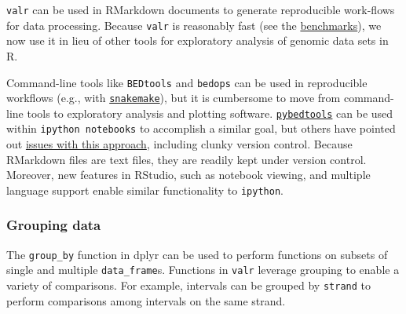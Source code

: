 \documentclass[9pt,a4paper]{extarticle}
\begin{document}
\texttt{valr} can be used in RMarkdown documents to generate
reproducible work-flows for data processing. Because \texttt{valr} is
reasonably fast (see the \protect\hyperlink{benchmarks}{benchmarks}), we
now use it in lieu of other tools for exploratory analysis of genomic
data sets in R.

Command-line tools like \texttt{BEDtools} and \texttt{bedops} can be
used in reproducible workflows (e.g., with
\href{https://bitbucket.org/snakemake/snakemake/wiki/Home}{\texttt{snakemake}}),
but it is cumbersome to move from command-line tools to exploratory
analysis and plotting software.
\href{https://pythonhosted.org/pybedtools/}{\texttt{pybedtools}} can be
used within \texttt{ipython\ notebooks} to accomplish a similar goal,
but others have pointed out
\href{https://www.r-bloggers.com/why-i-dont-like-jupyter-fka-ipython-notebook/}{issues
with this approach}, including clunky version control. Because RMarkdown
files are text files, they are readily kept under version control.
Moreover, new features in RStudio, such as notebook viewing, and multiple language support enable similar functionality to \texttt{ipython}.

\subsubsection{Grouping data}\label{grouping-data}

The \texttt{group\_by} function in dplyr can be used to perform functions
on subsets of single and multiple \texttt{data\_frame}s. Functions in
\texttt{valr} leverage grouping to enable a variety of comparisons. For
example, intervals can be grouped by \texttt{strand} to perform
comparisons among intervals on the same strand.
\end{document}
